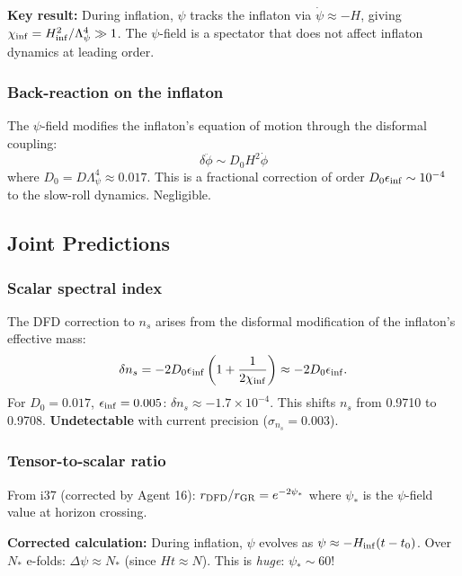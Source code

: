 \documentclass[11pt,a4paper]{article}
\begin{document}
\textbf{Key result:} During inflation, $\psi$ tracks the inflaton via $\dot{\psi} \approx -H$, giving $\chi_{\rm inf} = H_{\rm inf}^2/\Lambda_\psi^4 \gg 1$. The $\psi$-field is a spectator that does not affect inflaton dynamics at leading order.

\subsubsection{Back-reaction on the inflaton}

The $\psi$-field modifies the inflaton's equation of motion through the disformal coupling:
\begin{equation}
\delta\ddot{\phi} \sim D_0 H^2 \dot{\phi}
\end{equation}
where $D_0 = D\Lambda_\psi^4 \approx 0.017$. This is a fractional correction of order $D_0 \epsilon_{\rm inf} \sim 10^{-4}$ to the slow-roll dynamics. Negligible.

\subsection{Joint Predictions}

\subsubsection{Scalar spectral index}

The DFD correction to $n_s$ arises from the disformal modification of the inflaton's effective mass:
\begin{equation}
\delta n_s = -2D_0\epsilon_{\rm inf}\left(1 + \frac{1}{2\chi_{\rm inf}}\right) \approx -2D_0\epsilon_{\rm inf}.
\end{equation}
For $D_0 = 0.017$, $\epsilon_{\rm inf} = 0.005$: $\delta n_s \approx -1.7 \times 10^{-4}$. This shifts $n_s$ from 0.9710 to 0.9708. \textbf{Undetectable} with current precision ($\sigma_{n_s} = 0.003$).

\subsubsection{Tensor-to-scalar ratio}

From i37 (corrected by Agent 16): $r_{\rm DFD}/r_{\rm GR} = e^{-2\psi_*}$ where $\psi_*$ is the $\psi$-field value at horizon crossing.

\textbf{Corrected calculation:} During inflation, $\psi$ evolves as $\psi \approx -H_{\rm inf}(t - t_0)$. Over $N_*$ e-folds: $\Delta\psi \approx N_*$ (since $Ht \approx N$). This is \emph{huge}: $\psi_* \sim 60$!
\end{document}
